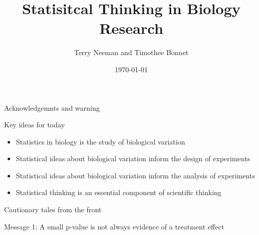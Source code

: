 \documentclass{beamer}
\title{Statisitcal Thinking in Biology Research}
\author{Terry Neeman and Timothee Bonnet}
\date{\today}
\begin{document}
\begin{frame}{}
\maketitle

\end{frame}

\begin{frame}{Acknowledgemnts and warning}

\end{frame}

\begin{frame}{Key ideas for today}

\begin{itemize}[<+->]
 \item Statistics in biology is the study of biological variation
 \item Statistical ideas about biological variation inform the design of experiments
 \item Statistical ideas about biological variation inform the analysis of experiments
 \item Statistical thinking is an essential component of scientific thinking
\end{itemize}

\end{frame}

\begin{frame}{Cautionary tales from the front}

\end{frame}

\begin{frame}{Message 1: A small p-value is not always evidence of a treatment effect}

\end{frame}
\end{document}

